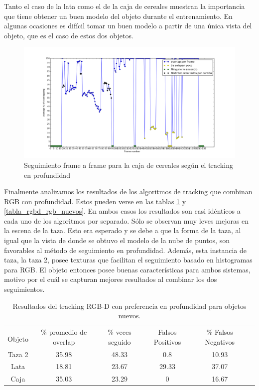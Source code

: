 Tanto el caso de la lata como el de la caja de cereales muestran la importancia que tiene obtener un buen modelo del objeto durante el entrenamiento. En algunas ocasiones es difícil tomar un buen modelo a partir de una única vista del objeto, que es el caso de estos dos objetos.

\begin{figure}
	\centering
	\includegraphics[width=\textwidth]{img/frame_a_frame/depth-caja.png}
	\caption{Seguimiento frame a frame para la caja de cereales según el tracking en profundidad}
	\label{frame_frame_d_nuevo}
\end{figure}


Finalmente analizamos los resultados de los algoritmos de tracking que combinan RGB con profundidad. Estos pueden verse en las tablas \ref{tabla_rgbd_d_nuevos} y \ref{tabla_rgbd_rgb_nuevos}. En ambos casos los resultados son casi idénticos a cada uno de los algoritmos por separado. Sólo se observan muy leves mejoras en la escena de la taza. Esto era esperado y se debe a que la forma de la taza, al igual que la vista de donde se obtuvo el modelo de la nube de puntos, son favorables al método de seguimiento en profundidad. Además, esta instancia de taza, la taza 2, posee texturas que facilitan el seguimiento basado en histogramas para RGB. El objeto entonces posee buenas características para ambos sistemas, motivo por el cuál se capturan mejores resultados al combinar los dos seguimientos.

\begin{table}[h]
	\centering
    \begin{tabular}{|c|c|c|c|c|c|}
    \hline
    & \multirow{2}{2.4cm}{\% promedio de overlap} & \multirow{2}{2cm}{\% veces seguido} & \multirow{2}{1.6cm}{Falsos Positivos} & \multirow{2}{1.6cm}{\% Falsos Negativos}\\
	Objeto & & & &\\
    \hline
    Taza 2  & 35.98      & 48.33      & 0.8     & 10.93 \\
    \hline
    Lata    & 18.81      & 23.67      & 29.33   & 37.07 \\
    \hline
    Caja    & 35.03      & 23.29      & 0       & 16.67 \\
    \hline
    \end{tabular}
\caption{Resultados del tracking RGB-D con preferencia en profundidad para objetos nuevos.}
\label{tabla_rgbd_d_nuevos}
\end{table}

